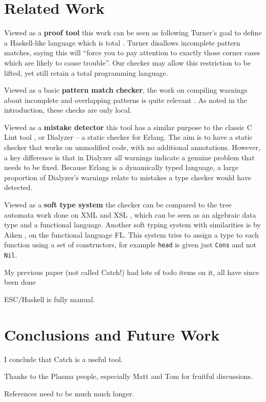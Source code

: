 \documentclass[preprint]{sigplanconf}
\newcommand{\T}[1]{\texttt{#1}}
\begin{document}
\section{Related Work}
\label{sec:related}

Viewed as a \textbf{proof tool} this work can be seen as following Turner's goal to define a Haskell-like language which is total \cite{tfp:total}. Turner disallows incomplete pattern matches, saying this will ``force you to pay attention to exactly those corner cases which are likely to cause trouble''. Our checker may allow this restriction to be lifted, yet still retain a total programming language.

Viewed as a basic \textbf{pattern match checker}, the work on compiling warnings about incomplete and overlapping patterns is quite relevant \cite{ghc,pattern_match}. As noted in the introduction, these checks are only local.

Viewed as a \textbf{mistake detector} this tool has a similar purpose to the classic C Lint tool \cite{lint}, or Dialyzer \cite{dialyzer} -- a static checker for Erlang. The aim is to have a static checker that works on unmodified code, with no additional annotations. However, a key difference is that in Dialyzer all warnings indicate a genuine problem that needs to be fixed. Because Erlang is a dynamically typed language, a large proportion of Dialyzer's warnings relate to mistakes a type checker would have detected.

Viewed as a \textbf{soft type system} the checker can be compared to the tree automata work done on XML and XSL \cite{static_xslt}, which can be seen as an algebraic data type and a functional language. Another soft typing system with similarities is by Aiken \cite{type:dynamic}, on the functional language FL. This system tries to assign a type to each function using a set of constructors, for example \T{head} is given just \T{Cons} and not \T{Nil}.

My previous paper (not called Catch!) had lots of todo items on it, all have since been done

ESC/Haskell is fully manual.


\section{Conclusions and Future Work}
\label{sec:conclusion}

I conclude that Catch is a useful tool.




%

\acks

Thanks to the Plasma people, especially Matt and Tom for fruitful discussions.

References need to be much much longer.



\end{document}

